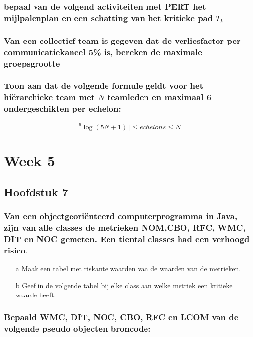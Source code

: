 \documentclass[a4paper,titlepage]{artikel1}
\begin{document}
   \subsubsection[Opdracht 2]{bepaal van de volgend activiteiten met PERT het mijlpalenplan en een schatting van het kritieke pad $T_k$}

   \subsubsection[Opdracht 3]{Van een collectief team is gegeven dat de verliesfactor per communicatiekaneel 5\% is, bereken de maximale groepsgrootte}

   \subsubsection[Opdracht 4]{Toon aan dat de volgende formule geldt voor het hi\"{e}rarchieke team met $N$ teamleden en maximaal 6 ondergeschikten per echelon:}
   \begin{displaymath}
     \lfloor^6\log{(5N+1)}\rfloor\leq echelons\leq N
   \end{displaymath}

   \section{Week 5}
   \subsection{Hoofdstuk 7}
   \subsubsection[Opdracht 1]{Van een objectgeori\"{e}nteerd computerprogramma in Java, zijn van alle classes de metrieken NOM,CBO, RFC, WMC, DIT en NOC gemeten. Een tiental classes had een verhoogd risico.}
   \begin{itemize}
     \item[a] Maak een tabel met riskante waarden van de waarden van de metrieken.
     \item[b] Geef in de volgende tabel bij elke class aan welke metriek een kritieke waarde heeft.
   \end{itemize}
   
   \subsubsection[Opdracht 2]{Bepaald WMC, DIT, NOC, CBO, RFC en LCOM van de volgende pseudo objecten broncode:}
\end{document}
